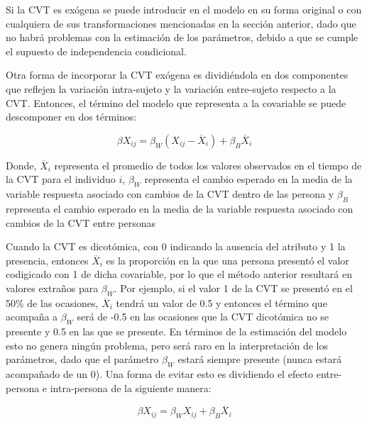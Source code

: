\documentclass[spanish]{article}
\numberwithin{figure}{subsection}
\numberwithin{equation}{subsection}
\numberwithin{table}{subsection}
\begin{document}


Si la CVT es exógena se puede introducir en el modelo en su forma original o con
cualquiera de sus transformaciones mencionadas en la sección anterior, dado que
no habrá problemas con la estimación de los parámetros, debido a que se cumple
el supuesto de independencia condicional.

Otra forma de incorporar la CVT exógena es dividiéndola en dos componentes que
reflejen la variación intra-sujeto y la variación entre-sujeto respecto
a la CVT. Entonces, el término del modelo que representa a la covariable se
puede descomponer en dos términos:

\[
	\beta X_{ij} = \beta_W (X_{ij} - \overline{X}_i) + \beta_B \overline{X}_i
\]

Donde, $\overline{X}_i$ representa el promedio de todos los valores observados
en el tiempo de la CVT para el individuo $i$, $\beta_W$ representa el cambio
esperado en la media de la variable respuesta asociado con cambios de la CVT
dentro de las persona y $\beta_B$ representa el cambio esperado en la media de
la variable respuesta asociado con cambios de la CVT entre personas


Cuando la CVT es dicotómica, con 0 indicando la ausencia del atributo y 1 la
presencia, entonces $\overline{X}_i$ es la proporción en la que una persona
presentó el valor codigicado con 1 de dicha covariable, por lo que el método
anterior resultará en valores extraños para $\beta_W$. Por ejemplo, si el valor
1 de la CVT se presentó en el 50\% de las ocasiones, $\overline{X}_i$ tendrá un
valor de 0.5 y entonces el término que acompaña a $\beta_W$ será de -0.5 en las
ocasiones que la CVT dicotómica no se presente y 0.5 en las que se presente. En
términos de la estimación del modelo esto no genera ningún problema, pero será
raro en la interpretación de los parámetros, dado que el parámetro $\beta_W$
estará siempre presente (nunca estará acompañado de un 0). Una forma de evitar
esto es dividiendo el efecto entre-persona e intra-persona de la siguiente
manera:

\[
	\beta X_{ij} = \beta_W X_{ij} + \beta_B \overline{X}_i
\]
\end{document}
